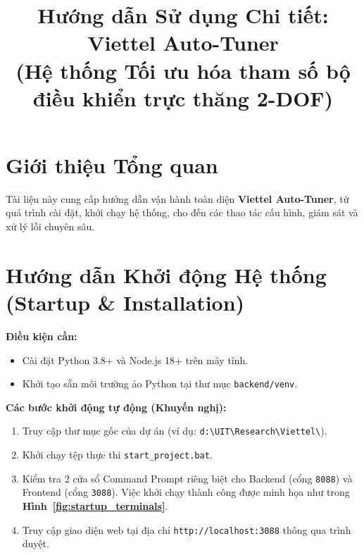 \documentclass[12pt,a4paper]{article}
\title{\textbf{Hướng dẫn Sử dụng Chi tiết: Viettel Auto-Tuner\\(Hệ thống Tối ưu hóa tham số bộ điều khiển trực thăng 2-DOF)}}
\author{}
\date{}
\begin{document}
\maketitle

\section{Giới thiệu Tổng quan}
Tài liệu này cung cấp hướng dẫn vận hành toàn diện \textbf{Viettel Auto-Tuner}, từ quá trình cài đặt, khởi chạy hệ thống, cho đến các thao tác cấu hình, giám sát và xử lý lỗi chuyên sâu.

\section{Hướng dẫn Khởi động Hệ thống (Startup \& Installation)}

\textbf{Điều kiện cần:}
\begin{itemize}
    \item Cài đặt Python 3.8+ và Node.js 18+ trên máy tính.
    \item Khởi tạo sẵn môi trường ảo Python tại thư mục \texttt{backend/venv}.
\end{itemize}

\textbf{Các bước khởi động tự động (Khuyến nghị):}
\begin{enumerate}
    \item Truy cập thư mục gốc của dự án (ví dụ: \texttt{d:\textbackslash UIT\textbackslash Research\textbackslash Viettel\textbackslash}).
    \item Khởi chạy tệp thực thi \texttt{start\_project.bat}.
    \item Kiểm tra 2 cửa sổ Command Prompt riêng biệt cho Backend (cổng \texttt{8088}) và Frontend (cổng \texttt{3088}). Việc khởi chạy thành công được minh họa như trong \textbf{Hình~\ref{fig:startup_terminals}}.
    \item Truy cập giao diện web tại địa chỉ \texttt{http://localhost:3088} thông qua trình duyệt.
\end{enumerate}
\end{document}
